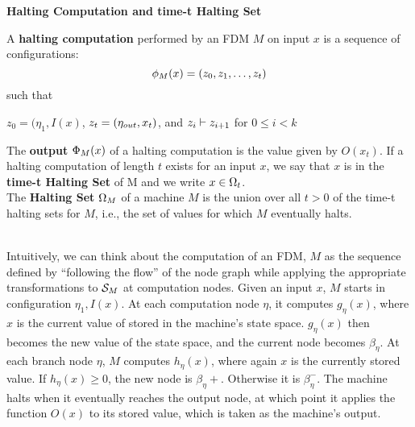 \begin{definition}{\textbf{Halting Computation and time-t Halting Set}}

  A \textbf{halting computation} performed by an FDM $M$ on input $x$
  is a sequence of configurations: 
  $$\phi_M(x) = (z_0, z_1, \ldots, z_t)$$ such that
  
  \centerline{$z_0 = (\eta_1, I(x)$, $z_t = (\eta_{out}, x_t)$, and $z_i
    \vdash z_{i+1}$ for $0 \leq i < k$}
  
  \vspace{\baselineskip}
  
  The \textbf{output} $\Phi_M(x)$ of a halting computation is
  the value given by $O(x_t)$.  If a halting computation of length $t$
  exists for an input $x$, we say that $x$ is in the \textbf{time-t
    Halting Set} of M and we write $x \in \Omega_t$.  \\

  The \textbf{Halting Set} $\Omega_M$ of a machine $M$ is the union
  over all $t > 0$ of the time-t halting sets for $M$, i.e., the set of
  values for which $M$ eventually halts.
\end{definition}

\\

Intuitively, we can think about the computation of an FDM, $M$ as the
sequence defined by ``following the flow'' of the node graph while
applying the appropriate transformations to $\mathcal{S}_M$ at
computation nodes. Given an input $x$, $M$ starts in configuration
$\eta_1, I(x)$. At each computation node $\eta$, it computes
$g_\eta(x)$, where $x$ is the current value of stored in the machine's
state space.  $g_\eta(x)$ then becomes the new value of the state
space, and the current node becomes $\beta_{\eta}$.  At each branch
node $\eta$, $M$ computes $h_\eta(x)$, where again $x$ is the
currently stored value.  If $h_\eta(x) \geq 0$, the new node is
$\beta_\eta+$.  Otherwise it is $\beta_\eta^-$.  The machine halts
when it eventually reaches the output node, at which point it applies
the function $O(x)$ to its stored value, which is taken as the
machine's output.

